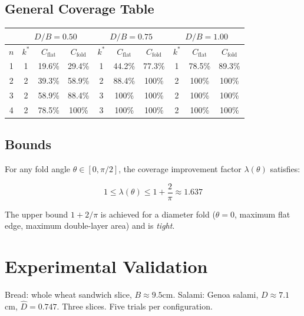 \documentclass[12pt]{article}
\begin{document}
\subsection{General Coverage Table}

\begingroup
\medskip
\caption{Optimal coverage: unfolded vs. folded. $k^*$ = optimal number of
wall-placed semicircles.}
\label{tab:results}
\begin{center}
\begin{tabular}{c|ccc|ccc|ccc}
& \multicolumn{3}{c}{$D/B = 0.50$} & \multicolumn{3}{c}{$D/B = 0.75$} &
 \multicolumn{3}{c}{$D/B = 1.00$}\\
\hline
$n$ & $k^*$ & $C_{\text{flat}}$ & $C_{\text{fold}}$ & $k^*$ & $C_{\text{flat}}$ & $C_{\text{fold}}$ &
 $k^*$ & $C_{\text{flat}}$ & $C_{\text{fold}}$ \\
\hline
1 & 1 & 19.6\% & 29.4\% & 1 & 44.2\% & 77.3\% & 1 & 78.5\% & 89.3\%\\
2 & 2 & 39.3\% & 58.9\% & 2 & 88.4\% & 100\% & 2 & 100\% & 100\%\\
3 & 2 & 58.9\% & 88.4\% & 3 & 100\% & 100\% & 2 & 100\% & 100\%\\
4 & 2 & 78.5\% & 100\% & 3 & 100\% & 100\% & 2 & 100\% & 100\%\\
\end{tabular}
\end{center}
\endgroup

\subsection{Bounds}

\begin{theorem}
For any fold angle $\theta \in [0, \pi/2]$, the coverage improvement factor
$\lambda(\theta)$ satisfies:

\begin{equation}
1 \leq \lambda(\theta) \leq 1 + \frac{2}{\pi} \approx 1.637
\end{equation}

The upper bound $1 + 2/\pi$ is achieved for a diameter fold ($\theta=0$,
maximum flat edge, maximum double-layer area) and is \emph{tight}.
\end{theorem}

\section{Experimental Validation}

Bread: whole wheat sandwich slice, $B \approx 9.5$cm.
Salami: Genoa salami, $D \approx 7.1$cm, $\hat{D} = 0.747$.
Three slices. Five trials per configuration.
\end{document}
